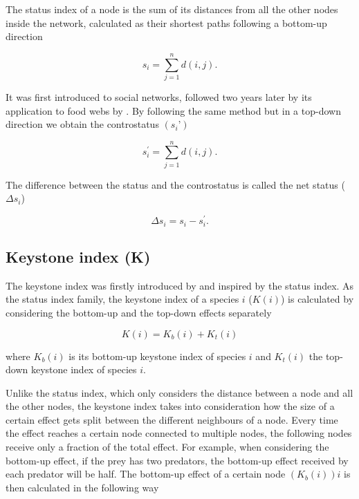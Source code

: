 		The status index of a node is the sum of its distances from all the other nodes inside the network, calculated as their shortest paths following a bottom-up direction \citep{Endredi2018}

						\begin{equation}
							s_i=\sum_{j=1}^{n}d\left(i,j\right).
						\end{equation}

		It was first introduced to social networks, followed two years later by its application to food webs by \citet{Harary1959, Harary1961}. By following the same method but in a top-down direction we obtain the controstatus $(s_i’)$

						\begin{equation}
							s_i^\prime=\sum_{j=1}^{n}d\left(i,j\right).
						\end{equation}

		The difference between the status and the controstatus is called the net status ($\Delta s_i$)

						\begin{equation}
							\Delta s_i=s_i-s_i^\prime.
						\end{equation}

	\subsection*{Keystone index (K)}

		The keystone index was firstly introduced by \citet{Jordan1999} and inspired by the status index. As the status index family, the keystone index of a species $i$ ($K(i)$) is calculated by considering the bottom-up and the top-down effects separately \citet{Jordan2006}

						\begin{equation}
							K\left(i\right)=K_b\left(i\right)+K_t\left(i\right)
						\end{equation}

		\noindent where $K_b\left(i\right)$ is its bottom-up keystone index of species $i$ and $K_t\left(i\right)$ the top-down keystone index of species $i$.

		Unlike the status index, which only considers the distance between a node and all the other nodes, the keystone index takes into consideration how the size of a certain effect gets split between the different neighbours of a node. Every time the effect reaches a certain node connected to multiple nodes, the following nodes receive only a fraction of the total effect. For example, when considering the bottom-up effect, if the prey has two predators, the bottom-up effect received by each predator will be half. The bottom-up effect of a certain node $(K_b\left(i\right))i$ is then calculated in the following way

